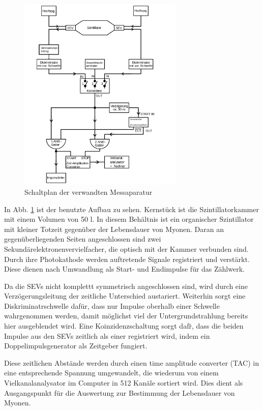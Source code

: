 \begin{figure}[t]
	\includegraphics[width=0.7\textwidth]{../pics/block.png}
	\caption{Schaltplan der verwandten Messaparatur}
	\label{pic:setup}
\end{figure}

In Abb. \ref{pic:setup} ist der benutzte Aufbau zu sehen. Kernst\"uck ist die Szintillatorkammer mit einem Volumen von 50 l. In diesem Beh\"altnis ist ein organischer Szintillator mit kleiner Totzeit gegen\"uber der Lebensdauer von Myonen. Daran an gegen\"uberliegenden Seiten angeschlossen sind zwei Sekund\"arelektronenvervielfacher, die optisch mit der Kammer verbunden sind. Durch ihre Photokathode werden auftretende Signale registriert und verst\"arkt. Diese dienen nach Umwandlung als Start- und Endimpulse f\"ur das Z\"ahlwerk.

Da die SEVs nicht komplettt symmetrisch angeschlossen sind, wird durch eine Verz\"ogerungsleitung der zeitliche Unterschied austariert. Weiterhin sorgt eine Diskriminatrschwelle daf\"ur, dass nur Impulse oberhalb einer Schwelle wahrgenommen werden, damit m\"oglichst viel der Untergrundstrahlung bereits hier ausgeblendet wird. Eine Koinzidenzschaltung sorgt daf\"r, dass die beiden Impulse aus den SEVs zeitlich als einer registriert wird, indem ein Doppelimpulsgenerator als Zeitgeber fungiert.

Diese zeitlichen Abst\"ande werden durch einen time amplitude converter (TAC) in eine entsprechende Spannung umgewandelt, die wiederum von einem Vielkanalanalysator im Computer in 512 Kan\"ale sortiert wird. Dies dient als Ausgangspunkt f\"ur die Auswertung zur Bestimmung der Lebensdauer von Myonen.

